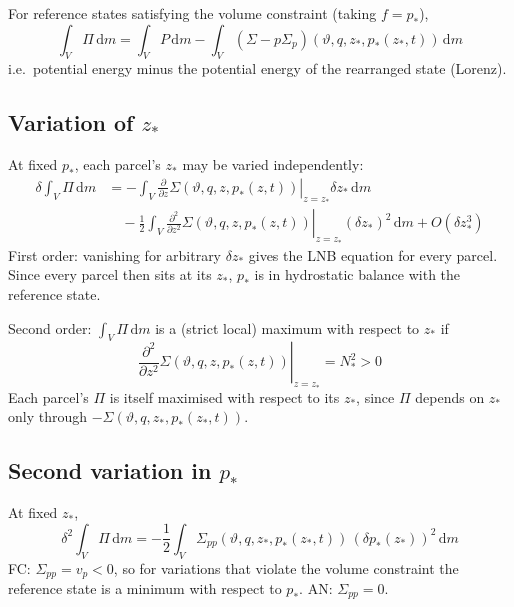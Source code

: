 \documentclass{article}
\begin{document}
For reference states satisfying the volume constraint (taking \(f = p_*\)),
\begin{equation}
    \int_V \Pi \, \mathrm{d}m
    =
    \int_V P \, \mathrm{d}m
    - \int_V
    \left(
        \Sigma - p \Sigma_p
    \right) (\vartheta, q, z_*, p_*(z_*, t)) \, \mathrm{d}m
\end{equation}
i.e.\ potential energy minus the potential energy of the rearranged state (Lorenz).

\subsection{Variation of \texorpdfstring{\(z_*\)}{z*}}
At fixed \(p_*\), each parcel's \(z_*\) may be varied independently:
\begin{align}
    \delta \int_V \Pi \, \mathrm{d}m
    & =
    - \int_V
    \left.
    \frac{\partial}{\partial z}
    \Sigma(\vartheta, q, z, p_*(z, t))
    \right|_{z = z_*}
    \delta z_* \, \mathrm{d}m
    \nonumber
    \\
    & \quad
    - \frac{1}{2} \int_V
    \left.
    \frac{\partial^2}{\partial z^2}
    \Sigma(\vartheta, q, z, p_*(z, t))
    \right|_{z = z_*}
    (\delta z_*)^2 \, \mathrm{d}m
    + O(\delta z_*^3)
\end{align}
First order: vanishing for arbitrary \(\delta z_*\) gives the LNB equation for every parcel.
Since every parcel then sits at its \(z_*\), \(p_*\) is in hydrostatic balance with the reference state.

Second order: \(\int_V \Pi \, \mathrm{d}m\) is a (strict local) maximum with respect to \(z_*\) if
\begin{equation}
    \left.
    \frac{\partial^2}{\partial z^2}
    \Sigma(\vartheta, q, z, p_*(z, t))
    \right|_{z = z_*}
    = N_*^2
    > 0
\end{equation}
Each parcel's \(\Pi\) is itself maximised with respect to its \(z_*\), since \(\Pi\) depends on \(z_*\) only through \(- \Sigma(\vartheta, q, z_*, p_*(z_*, t))\).

\subsection{Second variation in \texorpdfstring{\(p_*\)}{p*}}
At fixed \(z_*\),
\begin{equation}
    \delta^2 \int_V \Pi \, \mathrm{d}m
    =
    - \frac{1}{2} \int_V \Sigma_{pp}(\vartheta, q, z_*, p_*(z_*, t)) \, (\delta p_*(z_*))^2 \, \mathrm{d}m
\end{equation}
FC: \(\Sigma_{pp} = v_p < 0\), so for variations that violate the volume constraint the reference state is a minimum with respect to \(p_*\).
AN: \(\Sigma_{pp} = 0\).
\end{document}
